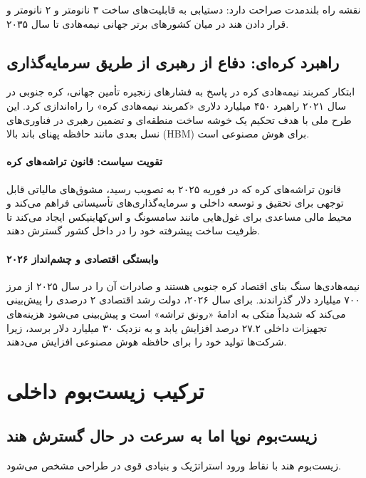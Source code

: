 \documentclass[10pt]{report}
\begin{document}
نقشه راه بلندمدت صراحت دارد: دستیابی به قابلیت‌های ساخت ۳ نانومتر و ۲ نانومتر و قرار دادن هند در میان کشورهای برتر جهانی نیمه‌هادی تا سال ۲۰۳۵.

\section{راهبرد کره‌ای: دفاع از رهبری از طریق سرمایه‌گذاری}

\begin{koreabox}{ابتکار کمربند نیمه‌هادی کره}
در پاسخ به فشارهای زنجیره تأمین جهانی، کره جنوبی در سال ۲۰۲۱ راهبرد ۴۵۰ میلیارد دلاری «کمربند نیمه‌هادی کره» را راه‌اندازی کرد. این طرح ملی با هدف تحکیم یک خوشه ساخت منطقه‌ای و تضمین رهبری در فناوری‌های نسل بعدی مانند حافظه پهنای باند بالا (HBM) برای هوش مصنوعی است.
\end{koreabox}

\subsubsection{تقویت سیاست: قانون تراشه‌های کره}
قانون تراشه‌های کره که در فوریه ۲۰۲۵ به تصویب رسید، مشوق‌های مالیاتی قابل توجهی برای تحقیق و توسعه داخلی و سرمایه‌گذاری‌های تأسیساتی فراهم می‌کند و محیط مالی مساعدی برای غول‌هایی مانند سامسونگ و اس‌کهاینیکس ایجاد می‌کند تا ظرفیت ساخت پیشرفته خود را در داخل کشور گسترش دهند.

\subsubsection{وابستگی اقتصادی و چشم‌انداز ۲۰۲۶}
\begin{researchbox}
نیمه‌هادی‌ها سنگ بنای اقتصاد کره جنوبی هستند و صادرات آن را در سال ۲۰۲۵ از مرز ۷۰۰ میلیارد دلار گذراندند. برای سال ۲۰۲۶، دولت رشد اقتصادی ۲ درصدی را پیش‌بینی می‌کند که شدیداً متکی به ادامۀ «رونق تراشه» است و پیش‌بینی می‌شود هزینه‌های تجهیزات داخلی ۲۷.۲ درصد افزایش یابد و به نزدیک ۳۰ میلیارد دلار برسد، زیرا شرکت‌ها تولید خود را برای حافظه هوش مصنوعی افزایش می‌دهند.
\end{researchbox}

\chapter{ترکیب زیست‌بوم داخلی}

\section{زیست‌بوم نوپا اما به سرعت در حال گسترش هند}
زیست‌بوم هند با نقاط ورود استراتژیک و بنیادی قوی در طراحی مشخص می‌شود.
\end{document}
